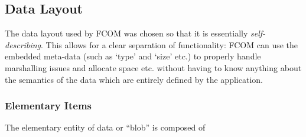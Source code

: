\documentclass[11pt]{article}
\newcommand{\fcom}{FCOM}
\newcommand{\blob}{blob}
\begin{document}
  \subsection{Data Layout}
    The data layout used by \fcom{} was chosen so that it is
    essentially {\em self-describing}. This allows for a clear
    separation of functionality: \fcom{} can use the embedded
    meta-data (such as `type' and `size' etc.) to properly
    handle marshalling issues and allocate space etc. without
    having to know anything about the semantics of the data
    which are entirely defined by the application. 

    \subsubsection{Elementary Items}
      The elementary entity of data or ``\blob{}'' is composed
      of
\end{document}
